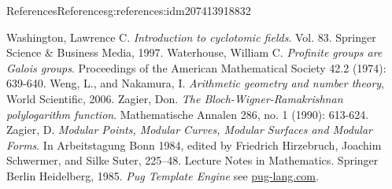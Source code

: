 \documentclass[oneside,10pt,]{book}
\numberwithin{equation}{section}
\begin{document}
\begin{references-chapter-numberless}{References}{}{References}{}{}{g:references:idm207413918832}
\begin{thebibliography}{9}
\hypertarget{x:biblio:bib-washington}{}Washington, Lawrence C. \textit{Introduction to cyclotomic fields}. Vol. 83. Springer Science \& Business Media, 1997.
\hypertarget{x:biblio:bib-waterhouse}{}Waterhouse, William C.  \textit{Profinite groups are Galois groups}. Proceedings of the American Mathematical Society 42.2 (1974): 639-640.
\hypertarget{x:biblio:bib-weng-nakamura}{}Weng, L., and Nakamura, I. \textit{Arithmetic geometry and number theory}, World Scientific, 2006.
\hypertarget{x:biblio:bib-zag-ram}{}Zagier, Don.  \textit{The Bloch-Wigner-Ramakrishnan polylogarithm function}. Mathematische Annalen 286, no. 1 (1990): 613-624.
\hypertarget{x:biblio:bib-zagier-modular}{}Zagier, D. \textit{Modular Points, Modular Curves, Modular Surfaces and Modular Forms}. In Arbeitstagung Bonn 1984, edited by Friedrich Hirzebruch, Joachim Schwermer, and Silke Suter, 225–48. Lecture Notes in Mathematics. Springer Berlin Heidelberg, 1985.
\hypertarget{x:biblio:bib-pug}{}\textit{Pug Template Engine} see \href{http://pug-lang.com/}{pug-lang.com}.
\end{thebibliography}
\end{references-chapter-numberless}
\end{document}
